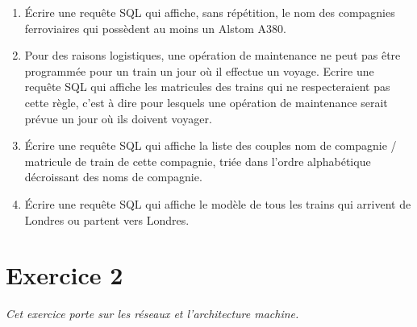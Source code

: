 \documentclass[11pt,a4paper,french,twoside]{PMCours}
\begin{document}
\begin{enumerate}
\item Écrire une requête SQL qui affiche, sans répétition, le nom des compagnies ferroviaires qui possèdent au moins un Alstom A380.
\item Pour des raisons logistiques, une opération de maintenance ne peut pas être programmée pour un train un jour où il effectue un voyage. Ecrire une requête SQL qui affiche les matricules des trains qui ne respecteraient pas cette règle, c'est à dire pour lesquels une opération de maintenance serait prévue un jour où ils doivent voyager. 
\item Écrire une requête SQL qui affiche la liste des couples nom de compagnie / matricule de train de cette compagnie, triée dans l'ordre alphabétique décroissant des noms de compagnie.
\item Écrire une requête SQL qui affiche le modèle de tous les trains qui arrivent de Londres ou partent vers Londres.
\end{enumerate}

\newpage
\section*{Exercice 2}
\emph{Cet exercice porte sur les réseaux et l'architecture machine.}

\medskip
\end{document}
